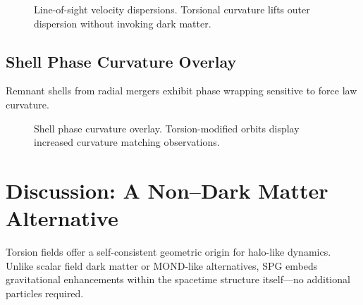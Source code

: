 \documentclass[11pt]{article}
\begin{document}
\begin{figure}[h]
\centering
{}
\caption{Line-of-sight velocity dispersions. Torsional curvature lifts outer dispersion without invoking dark matter.}
\label{fig:dispersion}
\end{figure}

\subsection*{Shell Phase Curvature Overlay}
Remnant shells from radial mergers exhibit phase wrapping sensitive to force law curvature.

\begin{figure}[h]
\centering
{}
\caption{Shell phase curvature overlay. Torsion-modified orbits display increased curvature matching observations.}
\label{fig:shell}
\end{figure}

\section{Discussion: A Non–Dark Matter Alternative}
Torsion fields offer a self-consistent geometric origin for halo-like dynamics. Unlike scalar field dark matter or MOND-like alternatives, SPG embeds gravitational enhancements within the spacetime structure itself—no additional particles required.
\end{document}
